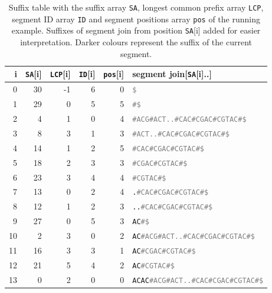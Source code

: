 \begin{table*}
    \caption{
    Suffix table with the suffix array \texttt{SA}, longest common prefix array \texttt{LCP}, segment ID array \texttt{ID} and segment positions array \texttt{pos} of the running example. Suffixes of segment join from position \texttt{SA}[i] added for easier interpretation. Darker colours represent the suffix of the current segment. \label{tab:suffix}
    }
    \begin{tabular}{rrrrrl}
        \toprule
        i & \texttt{SA}[i] & \texttt{LCP}[i] & \texttt{ID}[i] & \texttt{pos}[i] & segment join[\texttt{SA}[i]..] \\
        \midrule
         0  & 30 & -1 & 6 & 0 & \texttt{\textcolor{gray}{\$}}                                     \\
         1  & 29 &  0 & 5 & 5 & \texttt{\textcolor{gray}{\#\$}}                                   \\
         2  &  4 &  1 & 0 & 4 & \texttt{\textcolor{gray}{\#ACG\#ACT..\#CAC\#CGAC\#CGTAC\#\$}}     \\
         3  &  8 &  3 & 1 & 3 & \texttt{\textcolor{gray}{\#ACT..\#CAC\#CGAC\#CGTAC\#\$}}          \\
         4  & 14 &  1 & 2 & 5 & \texttt{\textcolor{gray}{\#CAC\#CGAC\#CGTAC\#\$}}                 \\
         5  & 18 &  2 & 3 & 3 & \texttt{\textcolor{gray}{\#CGAC\#CGTAC\#\$}}                      \\
         6  & 23 &  3 & 4 & 4 & \texttt{\textcolor{gray}{\#CGTAC\#\$}}                            \\
         7  & 13 &  0 & 2 & 4 & \texttt{.\textcolor{gray}{\#CAC\#CGAC\#CGTAC\#\$}}                \\
         8  & 12 &  1 & 2 & 3 & \texttt{..\textcolor{gray}{\#CAC\#CGAC\#CGTAC\#\$}}               \\
         9  & 27 &  0 & 5 & 3 & \texttt{AC\textcolor{gray}{\#\$}}                                 \\
        10  &  2 &  3 & 0 & 2 & \texttt{AC\textcolor{gray}{\#ACG\#ACT..\#CAC\#CGAC\#CGTAC\#\$}}   \\
        11  & 16 &  3 & 3 & 1 & \texttt{AC\textcolor{gray}{\#CGAC\#CGTAC\#\$}}                    \\
        12  & 21 &  5 & 4 & 2 & \texttt{AC\textcolor{gray}{\#CGTAC\#\$}}                          \\
        13  &  0 &  2 & 0 & 0 & \texttt{ACAC\textcolor{gray}{\#ACG\#ACT..\#CAC\#CGAC\#CGTAC\#\$}} \\

\end{tabular}
\end{table*}
